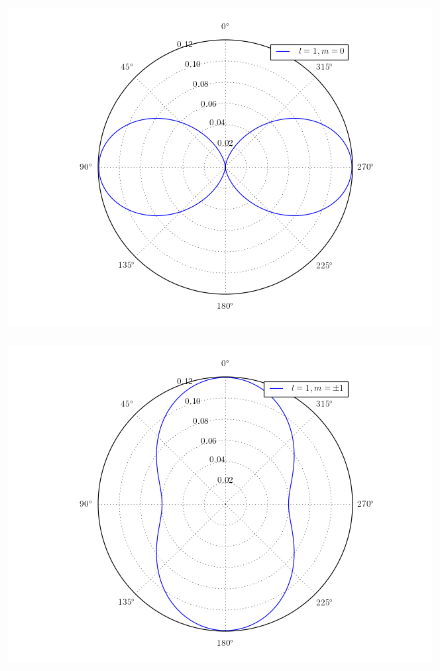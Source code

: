 \documentclass[a4paper,11pt]{article}
\numberwithin{equation}{section}
\begin{document}
\begin{figure}[H]
 \center
 \includegraphics[scale=0.6]{problema3fig2}
\end{figure}

\begin{figure}[H]
 \center
 \includegraphics[scale=0.6]{problema3fig3}
\end{figure}
\end{document}
